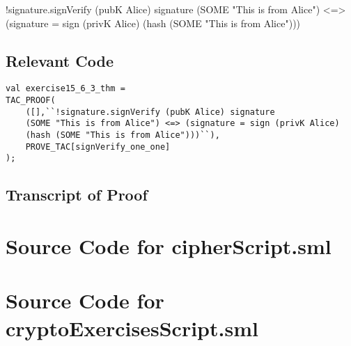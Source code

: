 \documentclass{report}
\begin{document}
!signature.signVerify (pubK Alice) signature (SOME "This is from Alice")
    <=> (signature = sign (privK Alice) (hash (SOME "This is from Alice")))

\section{Relevant Code}
\label{rel-15-6-3}
\begin{lstlisting}[frame=TBlr]
val exercise15_6_3_thm =
TAC_PROOF(
    ([],``!signature.signVerify (pubK Alice) signature 
    (SOME "This is from Alice") <=> (signature = sign (privK Alice) 
    (hash (SOME "This is from Alice")))``),
    PROVE_TAC[signVerify_one_one]
);
\end{lstlisting}

\section{Transcript of Proof}
\label{trans-15-6-3}


\appendix{}
\chapter{Source Code for cipherScript.sml}
\label{cha:source-code-ciph}


\chapter{Source Code for cryptoExercisesScript.sml}
\label{cha:source-code-crypto}

\end{document}
